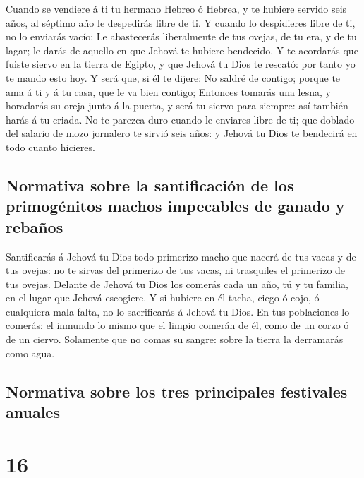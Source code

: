  Cuando se vendiere á ti tu hermano Hebreo ó Hebrea, y te
hubiere servido seis años, al séptimo año le despedirás libre de ti.
 Y cuando lo despidieres libre de ti, no lo enviarás vacío:
 Le abastecerás liberalmente de tus ovejas, de tu era, y de
tu lagar; le darás de aquello en que Jehová te hubiere bendecido.
 Y te acordarás que fuiste siervo en la tierra de Egipto, y
que Jehová tu Dios te rescató: por tanto yo te mando esto hoy.
 Y será que, si él te dijere: No saldré de contigo; porque
te ama á ti y á tu casa, que le va bien contigo;  Entonces
tomarás una lesna, y horadarás su oreja junto á la puerta, y será tu
siervo para siempre: así también harás á tu criada.  No te
parezca duro cuando le enviares libre de ti; que doblado del salario de
mozo jornalero te sirvió seis años: y Jehová tu Dios te bendecirá en
todo cuanto hicieres.

\hypertarget{normativa-sobre-la-santificaciuxf3n-de-los-primoguxe9nitos-machos-impecables-de-ganado-y-rebauxf1os}{%
\subsection{Normativa sobre la santificación de los primogénitos machos
impecables de ganado y
rebaños}\label{normativa-sobre-la-santificaciuxf3n-de-los-primoguxe9nitos-machos-impecables-de-ganado-y-rebauxf1os}}

 Santificarás á Jehová tu Dios todo primerizo macho que
nacerá de tus vacas y de tus ovejas: no te sirvas del primerizo de tus
vacas, ni trasquiles el primerizo de tus ovejas.  Delante
de Jehová tu Dios los comerás cada un año, tú y tu familia, en el lugar
que Jehová escogiere.  Y si hubiere en él tacha, ciego ó
cojo, ó cualquiera mala falta, no lo sacrificarás á Jehová tu Dios.
 En tus poblaciones lo comerás: el inmundo lo mismo que el
limpio comerán de él, como de un corzo ó de un ciervo. 
Solamente que no comas su sangre: sobre la tierra la derramarás como
agua.

\hypertarget{normativa-sobre-los-tres-principales-festivales-anuales}{%
\subsection{Normativa sobre los tres principales festivales
anuales}\label{normativa-sobre-los-tres-principales-festivales-anuales}}

\hypertarget{section-15}{%
\section{16}\label{section-15}}


